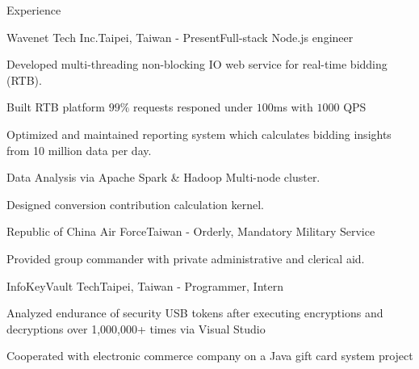 \documentclass{cv}
\begin{document}
\begin{cvSection}{Experience}

\begin{experienceSubsection}{Wavenet Tech Inc.}{Taipei, Taiwan}{ - Present}{Full-stack Node.js engineer}

\item Developed multi-threading non-blocking IO web service for real-time bidding (RTB).
\item Built RTB platform $99\%$ requests responed under $100$ms with $1000$ QPS
\item Optimized and maintained reporting system which calculates bidding insights from 10 million data per day.
\item Data Analysis via Apache Spark \& Hadoop Multi-node cluster.
\item Designed conversion contribution calculation kernel.

\end{experienceSubsection}

\begin{experienceSubsection}{Republic of China Air Force}{Taiwan}{ - }{Orderly, Mandatory Military Service}

\item Provided group commander with private administrative and clerical aid.

\end{experienceSubsection}

\begin{experienceSubsection}{InfoKeyVault Tech}{Taipei, Taiwan}{ - }{Programmer, Intern}

\item Analyzed endurance of security USB tokens after executing encryptions and decryptions over 1,000,000+ times via Visual Studio
\item Cooperated with electronic commerce company on a Java gift card system project

\end{experienceSubsection}

\end{cvSection}
\end{document}
